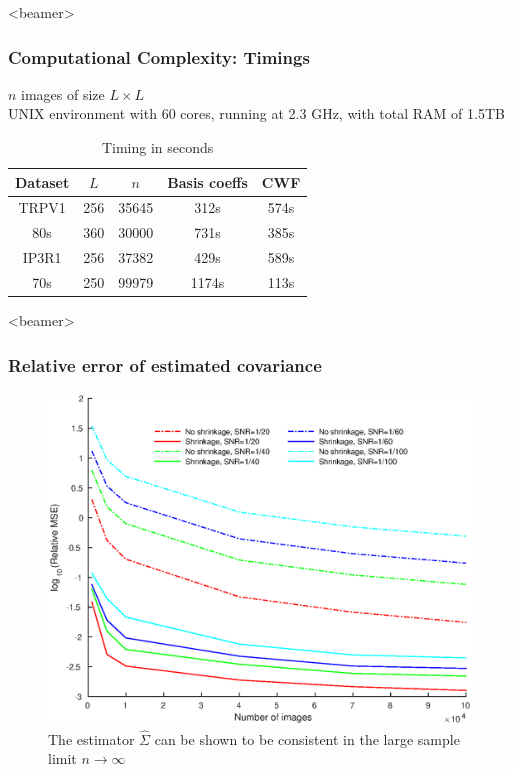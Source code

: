 \documentclass{beamer}
\begin{document}
\begin{frame}<beamer>
\frametitle{Computational Complexity: Timings}
$n$ images of size $L \times L$\\
UNIX environment with 60 cores,
running at 2.3 GHz, with total RAM of 1.5TB


\begin{table}[t]
  \centering
  \caption{Timing in seconds}
  \begin{tabular}{ccccc}
    \toprule
    Dataset & $L$ & $n$ & Basis coeffs  & CWF \\
    \midrule
    TRPV1 & 256 & 35645 & 312s & 574s \\
    80s & 360 & 30000 &  731s & 385s \\
    IP3R1  & 256 & 37382 & 429s & 589s\\
    70s & 250 &  99979 & 1174s & 113s \\
 \bottomrule
  \end{tabular}
\end{table}
\end{frame}



\begin{frame}<beamer>
\frametitle{Relative error of estimated covariance}
\begin{figure}
\centering
\includegraphics[width=0.6\linewidth]{figures/cwf_shrinkage_compare.eps}
\caption{The estimator $\hat \Sigma$ can be shown to be consistent in the large sample limit
$n \to \infty$}
\label{fig:shrinkage}
\end{figure}
\end{frame}
\end{document}
